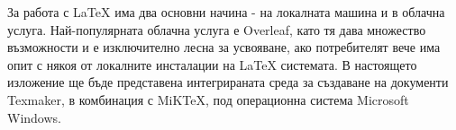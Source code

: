 За работа с LaTeX има два основни начина - на локалната машина и в облачна услуга. Най-популярната облачна услуга е Overleaf, като тя дава множество възможности и е изключително лесна за усвояване, ако потребителят вече има опит с някоя от локалните инсталации на LaTeX системата. В настоящето изложение ще бъде представена интегрираната среда за създаване на документи Texmaker, в комбинация с MiKTeX, под операционна система Microsoft Windows.


